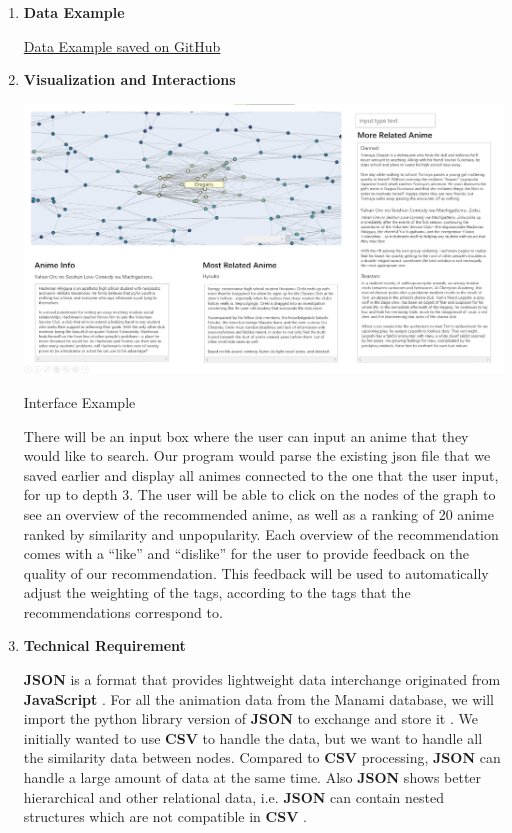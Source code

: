 \documentclass[fontsize=11pt]{article}
\begin{document}
\begin{enumerate}
    \item \textbf{Data Example}
    
    \href{https://gist.github.com/RealFakeAccount/cf34244d17039e78512428a1cf51d95f}{Data Example saved on GitHub} \citep{manami}
    
    \item \textbf{Visualization and Interactions}
    
    \begin{center}
        \includegraphics[scale=.2]{Interface Example.png}
        
        Interface Example
    \end{center}
    
    \quad There will be an input box where the user can input an anime that they would like to search. Our program would parse the existing json file that we saved earlier and display all animes connected to the one that the user input, for up to depth 3. The user will be able to click on the nodes of the graph to see an overview of the recommended anime, as well as a ranking of 20 anime ranked by similarity and unpopularity. Each overview of the recommendation comes with a “like” and “dislike” for the user to provide feedback on the quality of our recommendation. This feedback will be used to automatically adjust the weighting of the tags, according to the tags that the recommendations correspond to.
    
    \item \textbf{Technical Requirement}
    
    \quad \textbf{JSON} is a format that provides lightweight data interchange originated from \textbf{JavaScript} \citep{JSON21}. For all the animation data from the Manami database, we will import the python library version of \textbf{JSON} to exchange and store it \citep{Pyjson}. We initially wanted to use \textbf{CSV} to handle the data, but we want to handle all the similarity data between nodes. Compared to \textbf{CSV} processing, \textbf{JSON} can handle a large amount of data at the same time. Also \textbf{JSON} shows better hierarchical and other relational data, i.e. \textbf{JSON} can contain nested structures which are not compatible in \textbf{CSV} \citep{vs21}.
    

\end{enumerate}
\end{document}
